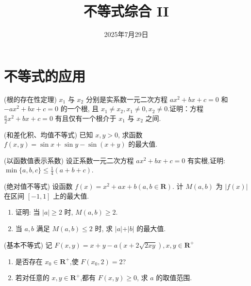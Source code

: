 \documentclass[a4paper , final]{ctexart}
\title{不等式综合 II}
\date{2025年7月29日}
\newenvironment{problem}[1]{%
  \item #1
  \par
  \vspace{8cm}
}{}
\begin{document}
\maketitle


\section*{不等式的应用}
 
\begin{problems}
  \begin{problem}
  {(根的存在性定理)
  $x_1$ 与 $x_2$ 分别是实系数一元二次方程 $ax^2 + bx + c = 0$ 和 $-ax^2 + bx + c = 0$ 的一个根, 且 $x_1 \ne x_2, x_1 \ne 0, x_2 \ne 0$.证明：方程 $\frac{a}{2}x^2 + bx + c = 0$ 有且仅有一个根介于 $x_1$ 与 $x_2$ 之间.
  }
  \end{problem}

  \begin{problem}
  {(和差化积、均值不等式)
  已知 $x, y > 0$, 求函数 $f(x,y) = \sin x + \sin y - \sin(x+y)$ 的最大值.
  }
  \end{problem}

  \begin{problem}
    {(以函数值表示系数)
      设正系数一元二次方程 $ax^2 + bx + c = 0$ 有实根,证明: $\min\{a,b,c\}\leq\frac{1}{4}(a+b+c)$.
    }
  \end{problem}

  \begin{problem}
    {(绝对值不等式)
      设函数 $f(x) = x^2+ax+b(a,b\in\mathbf{R})$. 计 $M(a,b)$ 为 $\vert f(x)\vert$ 在区间 $[-1,1]$ 上的最大值.
      \begin{enumerate}[label=(\arabic*)]
        \item 证明: 当 $\vert a\vert\ge 2$ 时, $M(a,b) \geq 2$.
        \item 当 $a,b$ 满足 $M(a,b)\leq 2$ 时, 求 $\vert a\vert + \vert b\vert$ 的最大值.
      \end{enumerate} 
    }
  \end{problem}

  \newpage
  \begin{problem}
    {(基本不等式)
      记 $F(x,y)=x+y-a(x+2\sqrt{2xy}),x,y\in\mathbf{R}^+$
      \begin{enumerate}[label=(\arabic*)]
        \item 是否存在 $x_0\in\mathbf{R}^+$,使 $F(x_0,2)=2$?
        \item 若对任意的 $x,y\in\mathbf{R}^+$,都有 $F(x,y)\geq 0$, 求 $a$ 的取值范围.
      \end{enumerate}
    }
  \end{problem}


\end{problems}
\end{document}
